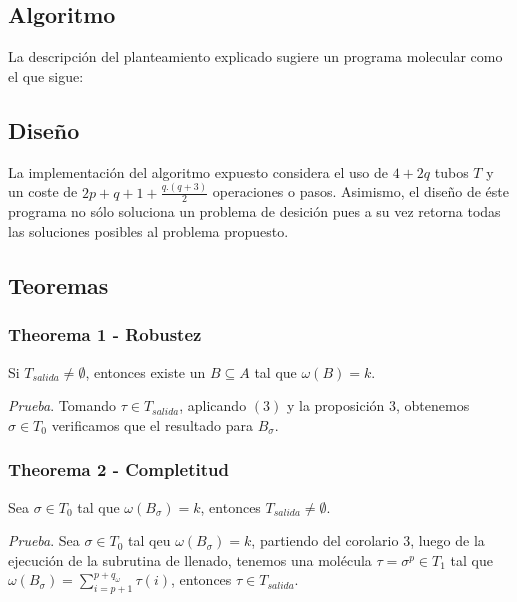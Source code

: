 \documentclass[12pt, letterpaper, twoside]{article}
\begin{document}
    \subsection{Algoritmo}
    La descripción del planteamiento explicado sugiere un programa molecular como el que sigue:
    \begin{algorithm}
        \begin{algorithmic}[1]
            \EndProcedure
        \end{algorithmic}
    \end{algorithm}

    \subsection{Diseño}

    La implementación del algoritmo expuesto considera el uso de $4+2q$ tubos $T$ y un coste de $2p+q+1+\frac{q.(q+3)}{2}$ operaciones o pasos. Asimismo, el diseño de éste programa no sólo soluciona un problema de desición pues a su vez retorna todas las soluciones posibles al problema propuesto.

    \subsection{Teoremas}
    \subsubsection{Theorema 1 - Robustez}
    Si $T_{salida}\neq\emptyset$, entonces existe un $B\subseteq{A}$ tal que $\omega(B)=k$.

    \emph{Prueba}. Tomando $\tau\in{T_{salida}}$, aplicando $(3)$ y la proposición 3, obtenemos $\sigma\in{T_0}$ verificamos que el resultado para $B_\sigma$.

    \subsubsection{Theorema 2 - Completitud}
    Sea $\sigma\in{T_0}$ tal que $\omega(B_\sigma)=k$, entonces $T_{salida}\neq\emptyset$.

    \emph{Prueba}. Sea $\sigma\in{T_0}$ tal qeu $\omega(B_\sigma)=k$, partiendo del corolario 3, luego de la ejecución de la subrutina de llenado, tenemos una molécula $\tau=\sigma^{p}\in{T_1}$ tal que $\omega(B_\sigma)=\sum^{p+q_\omega}_{i=p+1}\tau(i)$, entonces $\tau\in{T_{salida}}$.
\end{document}
